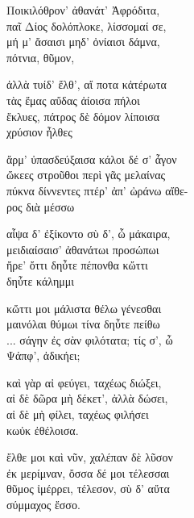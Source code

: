 \begin{gkverse}
Ποικιλόθρον’ ἀθανάτ’ Ἀφρόδιτα,\\
παῖ Δίος δολόπλοκε, λίσσομαί σε,\\
μή μ’ ἄσαισι μηδ’ ὀνίαισι δάμνα,\\
	πότνια, θῦμον,

ἀλλὰ τυίδ’ ἔλθ’, αἴ ποτα κἀτέρωτα\\
τὰς ἔμας αὔδας ἀίοισα πήλοι\\
ἔκλυες, πάτρος δὲ δόμον λίποισα\\
	χρύσιον ἦλθες

ἄρμ’ ὐπασδεύξαισα κάλοι δέ σ’ ἆγον\\
ὤκεες στροῦθοι περὶ γᾶς μελαίνας\\
πύκνα δίννεντες πτέρ’ ἀπ’ ὠράνω αἴθε-\\
ρος διὰ μέσσω

αἶψα δ’ ἐξίκοντο σὺ δ’, ὦ μάκαιρα,\\
μειδιαίσαισ’ ἀθανάτωι προσώπωι\\
ἤρε’ ὄττι δηὖτε πέπονθα κὤττι\\
δηὖτε κάλημμι

κὤττι μοι μάλιστα θέλω γένεσθαι\\
μαινόλαι θύμωι τίνα δηὖτε πείθω\\
... σάγην ἐς σὰν φιλότατα; τίς σ’, ὦ\\
Ψάπφ’, ἀδικήει;

καὶ γὰρ αἰ φεύγει, ταχέως διώξει,\\
αἰ δὲ δῶρα μὴ δέκετ’, ἀλλὰ δώσει,\\
αἰ δὲ μὴ φίλει, ταχέως φιλήσει\\
κωὐκ ἐθέλοισα.

ἔλθε μοι καὶ νῦν, χαλέπαν δὲ λῦσον\\
ἐκ μερίμναν, ὄσσα δέ μοι τέλεσσαι\\
θῦμος ἰμέρρει, τέλεσον, σὺ δ’ αὔτα\\
σύμμαχος ἔσσο. 
\end{gkverse}

\pagebreak
\section*{}

